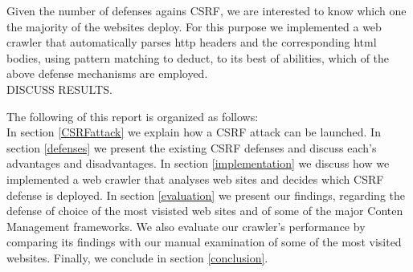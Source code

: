 Given the number of defenses agains CSRF, we are interested to know which one the majority of the websites 
deploy.  For this purpose we implemented a web crawler that automatically parses http headers and the 
corresponding html bodies, using pattern matching to deduct, to its best of abilities, which of the above
defense mechanisms are employed. \\
DISCUSS RESULTS.


The following of this report is organized as follows: \\
	In section \ref{CSRFattack} we explain how a CSRF attack can be launched.  In section \ref{defenses} we 
	present the existing CSRF defenses and discuss each's advantages and disadvantages.  In section \ref{implementation}
	we discuss how we implemented a web crawler that analyses web sites and decides which CSRF defense is deployed.  In
	section \ref{evaluation} we present our findings, regarding the defense of choice of the most visisted web sites 
	and of some of the major Conten Management frameworks.  We also evaluate our crawler's performance by comparing
	its findings with our manual examination of some of the most visited websites.  Finally, we conclude in section 
	\ref{conclusion}.
